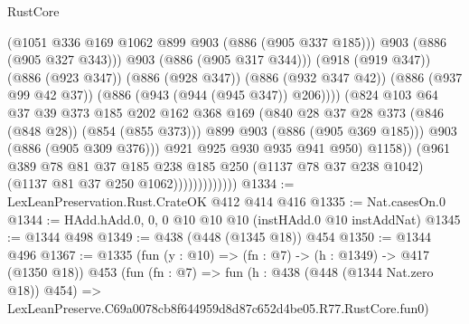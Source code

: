 \begin{lexlean}{RustCore}
\begin{coremodule}
                                          (@1051 @336 @169 @1062 @899 @903 (@886 (@905 @337 @185)))
                                          @903
                                          (@886 (@905 @327 @343)))
                                        @903
                                        (@886 (@905 @317 @344)))
                                      (@918 (@919 @347))
                                      (@886 (@923 @347))
                                      (@886 (@928 @347))
                                      (@886 (@932 @347 @42))
                                      (@886 (@937 @99 @42 @37))
                                      (@886 (@943 (@944 (@945 @347)) @206))))
                                  (@824
                                    @103
                                    @64
                                    @37
                                    @39
                                    @373
                                    @185
                                    @202
                                    @162
                                    @368
                                    @169
                                    (@840 @28 @37 @28 @373 (@846 (@848 @28)) (@854 (@855 @373)))
                                    @899
                                    @903
                                    (@886 (@905 @369 @185)))
                                  @903
                                  (@886 (@905 @309 @376)))
                                @921
                                @925
                                @930
                                @935
                                @941
                                @950)
                              @1158))
                          (@961
                            @389
                            @78
                            @81
                            @37
                            @185
                            @238
                            @185
                            @250
                            (@1137 @78 @37 @238 @1042)
                            (@1137 @81 @37 @250 @1062)))))))))))))
@1334 := LexLeanPreservation.Rust.CrateOK @412 @414 @416
@1335 := Nat.casesOn.{0}
@1344 := HAdd.hAdd.{0, 0, 0} @10 @10 @10 (instHAdd.{0} @10 instAddNat)
@1345 := @1344 @498
@1349 := @438 (@448 (@1345 @18)) @454
@1350 := @1344 @496
@1367 := @1335
    (fun (y : @10) => (fn : @7) -> (h : @1349) -> @417 (@1350 @18))
    @453
    (fun (fn : @7) =>
    fun (h : @438 (@448 (@1344 Nat.zero @18)) @454) =>
    LexLeanPreserve.C69a0078cb8f644959d8d87c652d4be05.R77.RustCore.fun0)

\end{coremodule}
\end{lexlean}
